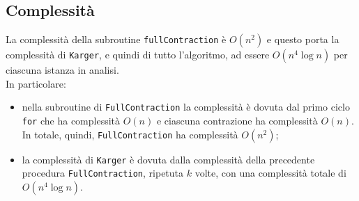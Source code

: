 \subsection{Complessità}

	La complessità della subroutine \texttt{fullContraction} è $O(n^2)$ e questo porta la complessità di \texttt{Karger}, e quindi di tutto l'algoritmo, ad essere $O(n^4\log n)$ per ciascuna istanza in analisi.\\
	In particolare:
	\begin{itemize}
		\item nella subroutine di \texttt{FullContraction} la complessità è dovuta dal primo ciclo \texttt{for} che ha complessità $O(n)$ e ciascuna contrazione ha complessità $O(n)$. In totale, quindi, \texttt{FullContraction} ha complessità $O(n^2)$;
		\item la complessità di \texttt{Karger} è dovuta dalla complessità della precedente procedura \texttt{FullContraction}, ripetuta $k$ volte, con una complessità totale di $O(n^4\log n)$.
	\end{itemize}
	
\pagebreak